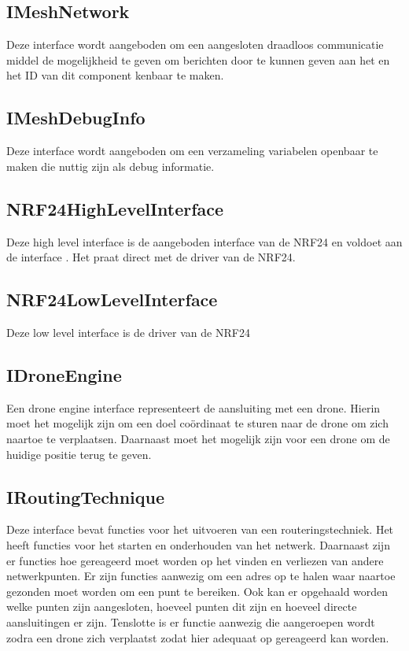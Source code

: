 \documentclass[a4paper, 11pt, oneside]{report}
\begin{document}
\subsection{IMeshNetwork}
\label{architectural:interfaces:IMeshNetwork}
Deze interface wordt aangeboden om een aangesloten draadloos communicatie middel de mogelijkheid te geven om berichten door te kunnen geven aan het  en het ID van dit component kenbaar te maken.

\subsection{IMeshDebugInfo}
\label{architectural:interfaces:IMeshDebugInfo}
Deze interface wordt aangeboden om een verzameling variabelen openbaar te maken die nuttig zijn als debug informatie.

\subsection{NRF24HighLevelInterface}
\label{architectural:interfaces:NRF24HighLevelInterface}

Deze high level interface is de aangeboden interface van de NRF24 en voldoet aan de interface . Het praat direct met de driver van de NRF24.  

\subsection{NRF24LowLevelInterface}
\label{architectural:interfaces:NRF24LowLevelInterface}
Deze low level interface is de driver van de NRF24


\subsection{IDroneEngine}
\label{architectural:interfaces:IDroneEngine}
Een drone engine interface representeert de aansluiting met een drone.
Hierin moet het mogelijk zijn om een doel coördinaat te sturen naar de drone om zich naartoe te verplaatsen. 
Daarnaast moet het mogelijk zijn voor een drone om de huidige positie terug te geven.
\subsection{IRoutingTechnique}
\label{architectural:interfaces:IRoutingTechnique}
Deze interface bevat functies voor het uitvoeren van een routeringstechniek.
Het heeft functies voor het starten en onderhouden van het netwerk.
Daarnaast zijn er functies hoe gereageerd moet worden op het vinden en verliezen van andere netwerkpunten.
Er zijn functies aanwezig om een adres op te halen waar naartoe gezonden moet worden om een punt te bereiken.
Ook kan er opgehaald worden welke punten zijn aangesloten, hoeveel punten dit zijn en hoeveel directe aansluitingen er zijn.
Tenslotte is er functie aanwezig die aangeroepen wordt zodra een drone zich verplaatst zodat hier adequaat op gereageerd kan worden.
\end{document}
